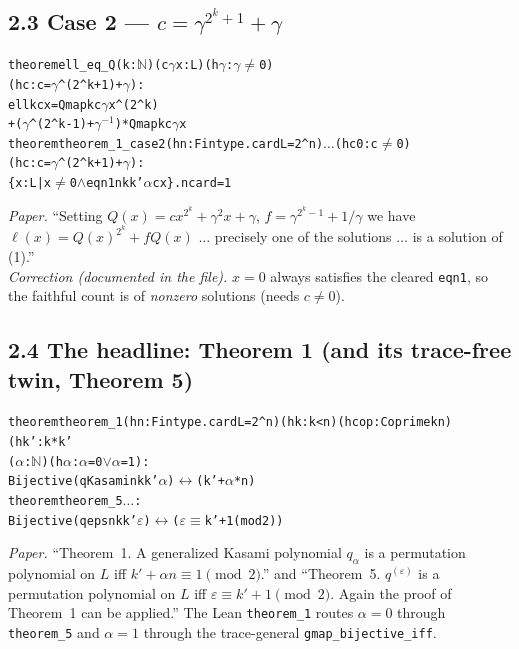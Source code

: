 \documentclass[11pt]{article}
\newenvironment{lean}{\begin{leanbox}\begin{alltt}\small}{\end{alltt}\end{leanbox}}
\newcommand{\lc}[1]{\texttt{\small #1}}
\begin{document}
\subsection*{2.3 Case 2 --- $c=\gamma^{2^k+1}+\gamma$}
\begin{lean}
theorem ell_eq_Q (k : \(\mathbb{N}\)) (c \(\gamma\) x : L) (h\(\gamma\) : \(\gamma\) \(\neq\) 0)
    (hc : c = \(\gamma\)^(2^k+1) + \(\gamma\)) :
    ell k c x = Qmap k c \(\gamma\) x ^ (2^k)
      + (\(\gamma\)^(2^k-1) + \(\gamma\)\(^{-1}\)) * Qmap k c \(\gamma\) x
theorem theorem_1_case2 (hn : Fintype.card L = 2^n) \(\dots\) (hc0 : c \(\neq\) 0)
    (hc : c = \(\gamma\)^(2^k+1) + \(\gamma\)) :
    \{x : L | x \(\neq\) 0 \(\wedge\) eqn1 n k k' \(\alpha\) c x\}.ncard = 1
\end{lean}
\emph{Paper.} ``Setting $Q(x)=cx^{2^k}+\gamma^2x+\gamma$,
$f=\gamma^{2^k-1}+1/\gamma$ we have $\ell(x)=Q(x)^{2^k}+fQ(x)$ $\dots$ precisely
one of the solutions $\dots$ is a solution of (1).''\\[2pt]
\emph{Correction (documented in the file).} $x=0$ always satisfies the cleared
\lc{eqn1}, so the faithful count is of \emph{nonzero} solutions (needs $c\neq0$).

\subsection*{2.4 The headline: Theorem 1 (and its trace-free twin, Theorem 5)}
\begin{lean}
theorem theorem_1 (hn : Fintype.card L = 2^n) (hk : k < n) (hcop : Coprime k n)
    (hk' : k*k' %
    (\(\alpha\) : \(\mathbb{N}\)) (h\(\alpha\) : \(\alpha\) = 0 \(\vee\) \(\alpha\) = 1) :
    Bijective (qKasami n k k' \(\alpha\)) \(\leftrightarrow\) (k' + \(\alpha\)*n) %
theorem theorem_5 \(\dots\) :
    Bijective (qeps n k k' \(\varepsilon\)) \(\leftrightarrow\) (\(\varepsilon \equiv\) k'+1  (mod 2))
\end{lean}
\emph{Paper.} ``Theorem~1. A generalized Kasami polynomial $q_\alpha$ is a
permutation polynomial on $L$ iff $k'+\alpha n\equiv1\pmod2$.'' and
``Theorem~5. $q^{(\varepsilon)}$ is a permutation polynomial on $L$ iff
$\varepsilon\equiv k'+1\pmod2$. Again the proof of Theorem~1 can be applied.''
The Lean \lc{theorem\_1} routes $\alpha=0$ through \lc{theorem\_5} and
$\alpha=1$ through the trace-general \lc{gmap\_bijective\_iff}.
\end{document}
